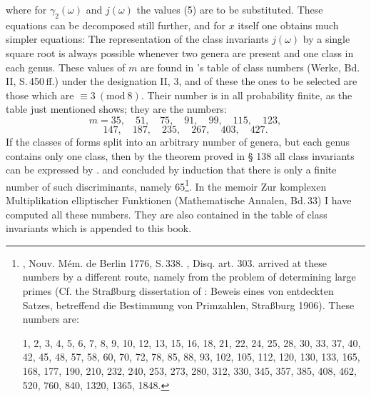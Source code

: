 
where for $\gamma_2(\omega)$ and $j(\omega)$ the values (5) are to be substituted. These equations can be decomposed still further, and for $x$ itself one obtains much simpler equations:
The representation of the class invariants $j(\omega)$ by a single square root is always possible whenever two genera are present and one class in each genus. These values of $m$ are found in 's table of class numbers (Werke, Bd.\,II, S.\,450\,ff.) under the designation II, 3, and of these the ones to be selected are those which are $\equiv 3\ (\mathrm{mod}\ 8)$. Their number is in all probability finite, as the table just mentioned shows; they are the numbers:
\[m = 35, \quad 51, \quad 75, \quad 91, \quad 99, \quad 115, \quad 123,\]
\[147, \quad 187, \quad 235, \quad 267, \quad 403, \quad 427.\]
If the classes of forms split into an arbitrary number of genera, but each genus contains only one class, then by the theorem proved in § 138 all class invariants can be expressed by .  and  concluded by induction that there is only a finite number of such discriminants, namely 65\footnote{, Nouv. Mém. de Berlin 1776, S.\,338. , Disq. art. 303.  arrived at these numbers by a different route, namely from the problem of determining large primes (Cf. the Straßburg dissertation of : Beweis eines von  entdeckten Satzes, betreffend die Bestimmung von Primzahlen, Straßburg 1906). These numbers are:

1, 2, 3, 4, 5, 6, 7, 8, 9, 10, 12, 13, 15, 16, 18, 21, 22, 24, 25, 28, 30, 33, 37, 40, 42, 45, 48, 57, 58, 60, 70, 72, 78, 85, 88, 93, 102, 105, 112, 120, 130, 133, 165, 168, 177, 190, 210, 232, 240, 253, 273, 280, 312, 330, 345, 357, 385, 408, 462, 520, 760, 840, 1320, 1365, 1848.

\par\medskip\noindent\makebox[\linewidth]{\rule{0.25\linewidth}{0.2pt}}}. In the memoir \glqq Zur komplexen Multiplikation elliptischer Funktionen\grqq{} (Mathematische Annalen, Bd.\,33) I have computed all these numbers. They are also contained in the table of class invariants which is appended to this book.
